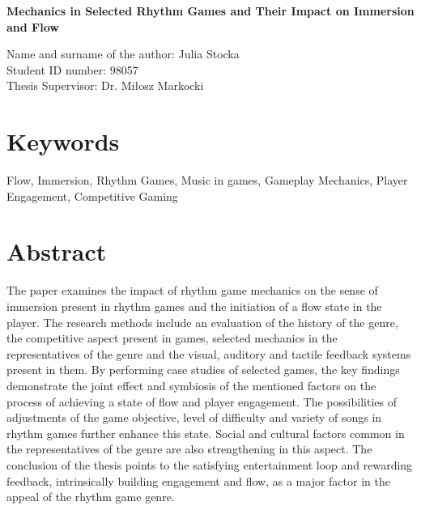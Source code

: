 \begin{center}
   \textbf{\large Mechanics in Selected Rhythm Games and Their Impact on Immersion and Flow}
\end{center}
Name and surname of the author: Julia Stocka \\
Student ID number: 98057 \\
Thesis Supervisor: Dr. Miłosz Markocki

\section*{Keywords}
\noindent
Flow, Immersion, Rhythm Games, Music in games, Gameplay Mechanics, Player Engagement, Competitive Gaming

\section*{Abstract}
\noindent
The paper examines the impact of rhythm game mechanics on the sense of immersion present in rhythm games and the initiation of a flow state in the player. The research methods include an evaluation of the history of the genre, the competitive aspect present in games, selected mechanics in the representatives of the genre and the visual, auditory and tactile feedback systems present in them. By performing case studies of selected games, the key findings demonstrate the joint effect and symbiosis of the mentioned factors on the process of achieving a state of flow and player engagement. The possibilities of adjustments of the game objective, level of difficulty and variety of songs in rhythm games further enhance this state. Social and cultural factors common in the representatives of the genre are also strengthening in this aspect. The conclusion of the thesis points to the satisfying entertainment loop and rewarding feedback, intrinsically building engagement and flow, as a major factor in the appeal of the rhythm game genre.
\pagebreak
